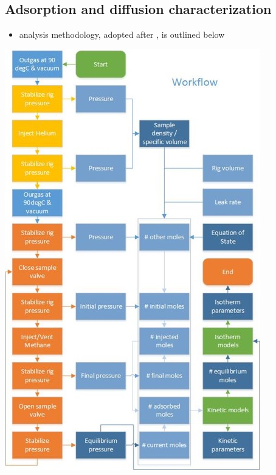 \documentclass[11pt]{article}
\begin{document}
\subsection{Adsorption and diffusion characterization}
\label{sec:org249ffdc}
\begin{itemize}
\item analysis methodology, adopted after \cite{rouquerol1994}, is outlined below
\end{itemize}
\begin{center}
\includegraphics[width=.9\linewidth]{./adsorption_workflow.jpg}
\end{center}
\end{document}
